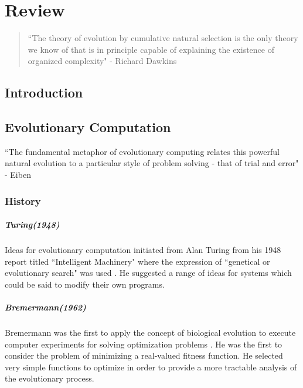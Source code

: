 \chapter{Review}

\begin{quote}
``The theory of evolution by cumulative natural selection is the only theory we know of that is in principle capable of explaining the existence of organized complexity" - Richard Dawkins \cite{dawkins1996}
\end{quote}

\section{Introduction}

\section{Evolutionary Computation}

``The fundamental metaphor of evolutionary computing relates this powerful natural evolution to a particular style of problem solving - that of trial and error" - Eiben \cite{eiben2003}

\subsection{History}

\paragraph{Turing(1948)}
Ideas for evolutionary computation initiated from Alan Turing from his 1948 report titled ``Intelligent Machinery" where the expression of ``genetical or evolutionary search"  was used \cite{turing1948}. He suggested a range of ideas for systems which could be said to modify their own programs. 

\paragraph{Bremermann(1962)}
Bremermann was the first to apply the concept of biological evolution to execute computer experiments for solving optimization problems \cite{bremermann1962}. He was the first to consider the problem of minimizing a real-valued fitness function. He selected very simple functions to optimize in order to provide a more tractable analysis of the evolutionary process.

